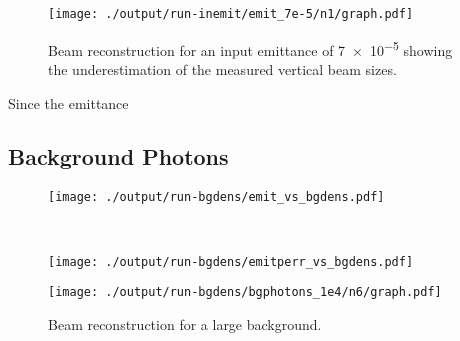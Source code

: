\begin{figure}[!tb]
	\centering
	\texttt{[image: ./output/run-inemit/emit\_7e-5/n1/graph.pdf]}
	\caption{
		Beam reconstruction for an input emittance of \num{7e-5} showing the
		underestimation of the measured vertical beam sizes.
	}
	\label{fig:large_emit}
\end{figure}


Since the emittance 

\subsection{Background Photons}


\begin{figure*}[!t]
	\centering
	\begin{subfigure}[t]{\columnwidth}
		\centering
		\texttt{[image: ./output/run-bgdens/emit\_vs\_bgdens.pdf]}
		\caption{
		}
		\label{fig:emit_bgdens}
	\end{subfigure}%
	~
	\begin{subfigure}[t]{\columnwidth}
		\centering
		\texttt{[image: ./output/run-bgdens/emitperr\_vs\_bgdens.pdf]}
		\caption{
		}
		\label{fig:emitperr_bgdens}
	\end{subfigure}%
\end{figure*}

\begin{figure}[!tb]
	\centering
	\texttt{[image: ./output/run-bgdens/bgphotons\_1e4/n6/graph.pdf]}
	\caption{
		Beam reconstruction for a large background.
	}
	\label{fig:large_bg}
\end{figure}



